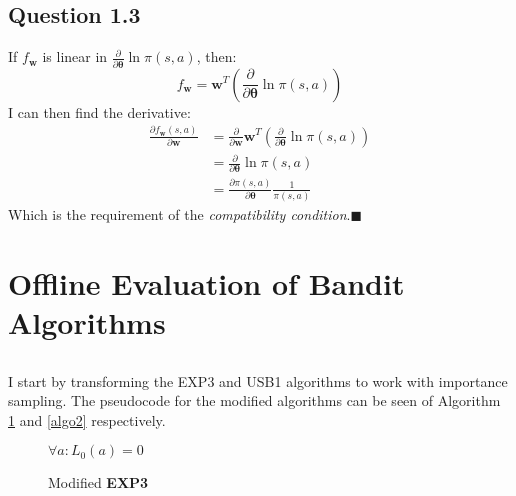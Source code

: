 \documentclass[a4paper]{article}
\newcommand*{\QEDA}{\hfill\ensuremath{\blacksquare}}%
\newcommand*{\bs}[1]{\boldsymbol{#1}}
\begin{document}
\subsection*{Question 1.3}
\label{subsec:13}
If $f_{\boldsymbol{w}}$ is linear in $\frac{\partial}{\partial
  \boldsymbol{\theta}} \ln \pi(s, a)$, then: 
\[
f_{\boldsymbol{w}} = \bs{w}^T \left(\frac{\partial}{\partial \boldsymbol{\theta}} \ln \pi(s, a)\right)
\]
I can then find the derivative:
\begin{align*}
  \frac{\partial f_{\bs{w}} (s,a)}{\partial \boldsymbol{w}} &=
  \frac{\partial}{\partial \boldsymbol{w}} \bs{w}^T
  \left(\frac{\partial}{\partial \boldsymbol{\theta}} \ln \pi(s, a)\right)\\
  &=
  \frac{\partial}{\partial \boldsymbol{\theta}} \ln \pi(s, a)\\
  &= \frac{\partial \pi(s,a)}{\partial
    \bs{\theta}}\frac{1}{\pi(s, a)} \tag{using chain rule}
\end{align*}
Which is the requirement of the \emph{compatibility condition}.\QEDA

\section{Offline Evaluation of Bandit Algorithms}
\label{sec:2}
\subsection{}
\label{subsec:21}

\subsection{}
\label{subsec:22}
\subsubsection{}
I start by transforming the EXP3 and USB1 algorithms to work with importance
sampling.
The pseudocode for the modified algorithms can be seen of Algorithm \ref{algo1}
and \ref{algo2} respectively.
\begin{figure}[ht]
\begin{algorithm}[H]
 \caption{Modified \textbf{EXP3}}
 \label{algo1}
 \DontPrintSemicolon
 $\forall a: L_0(a) = 0$\;
\end{algorithm}
\end{figure}
\end{document}
